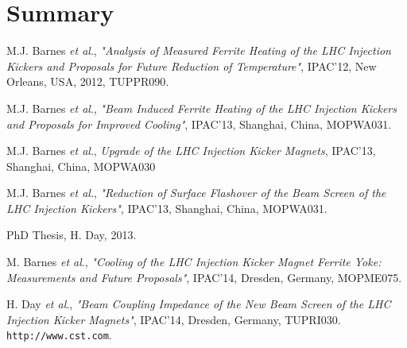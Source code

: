 \documentclass[a4paper,
              ]{jacow}
\begin{document}
\section{Summary}




\begin{thebibliography}{9}

M.J. Barnes \emph{et al}., \emph{"Analysis of Measured Ferrite Heating of the LHC Injection Kickers and Proposals for Future Reduction of Temperature"}, IPAC'12, New Orleans, USA, 2012, TUPPR090.

M.J. Barnes \emph{et al}., \emph{"Beam Induced Ferrite Heating of the LHC Injection Kickers and Proposals for Improved Cooling"}, IPAC'13, Shanghai, China, MOPWA031.

M.J. Barnes \emph{et al}., \emph{Upgrade of the LHC Injection Kicker Magnets}, IPAC'13, Shanghai, China, MOPWA030

M.J. Barnes \emph{et al}., \emph{"Reduction of Surface Flashover of the Beam Screen of the LHC Injection Kickers"}, IPAC'13, Shanghai, China, MOPWA031.

PhD Thesis, H. Day, 2013.

M. Barnes \emph{et al}., \emph{"Cooling of the LHC Injection Kicker Magnet Ferrite Yoke: Measurements and Future Proposals"}, IPAC'14, Dresden, Germany, MOPME075.

H. Day \emph{et al}., \emph{"Beam Coupling Impedance of the New Beam Screen of the LHC Injection Kicker Magnets"}, IPAC'14, Dresden, Germany, TUPRI030.
\texttt{http://www.cst.com}.

\end{thebibliography}
\end{document}

